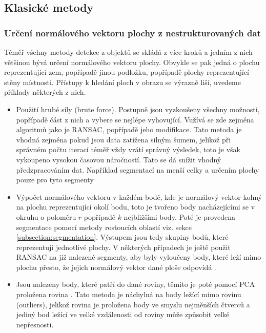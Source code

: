 \documentclass[twoside]{ctuthesis}
\begin{document}
\subsection{Klasické metody}

\subsubsection{Určení normálového vektoru plochy z nestrukturovaných dat}
\label{subsec:nomrmal_est}
Téměř všehny metody detekce z objektů se skládá z více kroků a jedním z nich většinou bývá určení normálového vektoru plochy. Obvykle se pak jedná o plochu reprezentující zem, popřípadě jinou podložku, popřípadě plochy reprezentující stěny místnosti. Přístupy k hledání ploch v obrazu se výrazně liší, uvedeme příklady některých z nich.

\begin{itemize} 
    \item Použití hrubé síly (brute force). Postupně jsou vyzkoušeny všechny možnosti, popřípadě část z nich a vybere se nejlépe vyhovující. Vužívá se zde zejména algoritmů jako je RANSAC, popřípadě jeho modifikace. Tato metoda je vhodná zejména pokud jsou data zatížena silným šumem, jelikož při správném počtu iterací téměř vždy vrátí správný výsledek, toto je však vykoupeno vysokou časovou náročností.\cite{RANSAC_plane,single_RGBD_reconstruction} Tato se dá snížit vhodný předzpracováním dat. Například segmentací na menší celky a určením plochy pouze pro tyto segmenty \cite{rusu2009close}
    \item Výpočet normálového vektoru v každém bodě, kde je normálový vektor kolmý na plochu reprezentující okolí bodu, toto je tvořeno body nacházejícími se v okruhu o poloměru $r$ \cite{wang2015dominant} popřípadě $k$  nejbližšími body\cite{holz2011real,trevor2013efficient}. Poté je provedena segmentace pomocí metody rostoucích oblastí viz. sekce \ref{subsection:segmentation}. Výstupem jsou tedy skupiny bodů, které reprezentují jednotlivé plochy. V některých případech je ještě použit RANSAC na již nalezené segmenty, aby byly vyloučeny body, které leží mimo plochu přesto, že jejich normálový vektor dané ploše odpovídá \cite{lai2011large}.
    \item Jsou nalezeny body, které patří do dané roviny, těmito je poté pomocí PCA proložena rovina \cite{zhang2016fast}. Tato metoda je náchylná na body ležící mimo rovinu (outliers), jelikož rovina je proložena body ve smyslu nejměnších čtverců a jediný bod ležící ve velké vzdálenosti od roviny může způsobit velké nepřesnosti.
\end{itemize}
\end{document}
